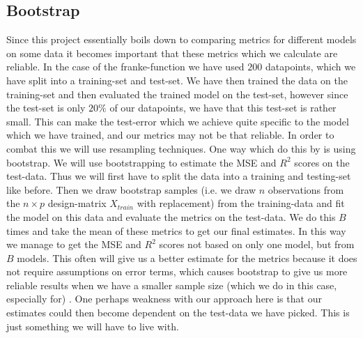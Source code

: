 \documentclass{article}
\begin{document}
\subsection{Bootstrap}
Since this project essentially boils down to comparing metrics for different
models on some data it becomes important that these metrics which we calculate
are reliable. In the case of the franke-function we have used $200$ datapoints,
which we have split into a training-set and test-set. We have then trained the
data on the training-set and then evaluated the trained model on the test-set,
however since the test-set is only $20\%$ of our datapoints, we have that this
test-set is rather small. This can make the test-error which we achieve quite
specific to the model which we have trained, and our metrics may not be that
reliable. In order to combat this we will use resampling techniques. One way
which do this by is using bootstrap. We will use bootstrapping to estimate the
MSE and $R^2$ scores on the test-data. Thus we will first have to split the data
into a training and testing-set like before. Then we draw bootstrap samples
(i.e. we draw $n$ observations from the $n\times p$ design-matrix $X_{train}$
with replacement) from the training-data and fit the model on this data and
evaluate the metrics on the test-data. We do this $B$ times and take the mean of
these metrics to get our final estimates. In this way we manage to get the MSE
and $R^2$ scores not based on only one model, but from $B$ models. This often
will give us a better estimate for the metrics because it does not require
assumptions on error terms, which causes bootstrap to give us more reliable
results when we have a smaller sample size (which we do in this case, especially
for) \cite[s.~5.3]{lecturenotes5}. One perhaps weakness with our approach here
is that our estimates could then become dependent on the test-data we have
picked. This is just something we will have to live with.
\end{document}
